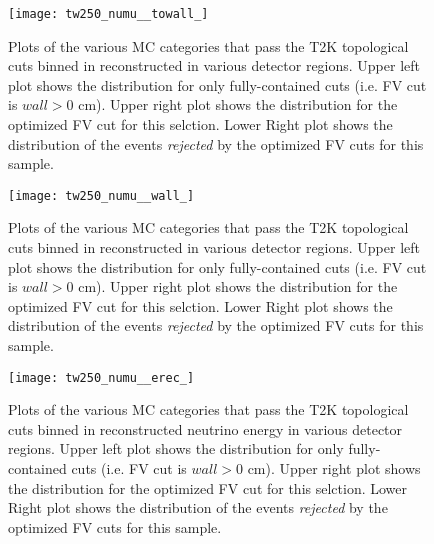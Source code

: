 \begin{figure}[h]
  \begin{center}
    \texttt{[image: tw250\_numu\_\_towall\_]}
  \end{center}
  \caption{Plots of the various MC categories that pass the T2K \numu
  topological cuts binned in reconstructed \towall in various detector regions. Upper left
  plot shows the distribution for only fully-contained cuts (i.e. FV cut is \@ $wall > 0$ cm).
  Upper right plot shows the distribution for the optimized FV cut for this selction.
  Lower Right plot shows the distribution of the events \emph{rejected} by the optimized
  FV cuts for this sample.
  }
  \label{fig:compnumutowall}
\end{figure}


\begin{figure}[h]
  \begin{center}
    \texttt{[image: tw250\_numu\_\_wall\_]}
  \end{center}
  \caption{Plots of the various MC categories that pass the T2K \numu
  topological cuts binned in reconstructed \wall in various detector regions. Upper left
  plot shows the distribution for only fully-contained cuts (i.e. FV cut is \@ $wall > 0$ cm).
  Upper right plot shows the distribution for the optimized FV cut for this selction.
  Lower Right plot shows the distribution of the events \emph{rejected} by the optimized
  FV cuts for this sample.
  }
  \label{fig:compnumuwall}
\end{figure}


\begin{figure}[h]
  \begin{center}
    \texttt{[image: tw250\_numu\_\_erec\_]}
  \end{center}
  \caption{Plots of the various MC categories that pass the T2K \numu
  topological cuts binned in reconstructed neutrino energy in various detector
  regions. Upper left plot shows the distribution for only fully-contained cuts
  (i.e. FV cut is \@ $wall > 0$ cm).  Upper right plot shows the distribution
  for the optimized FV cut for this selction.  Lower Right plot shows the
  distribution of the events \emph{rejected} by the optimized FV cuts for this
  sample.
  }
  \label{fig:compnumuerec}
\end{figure}


